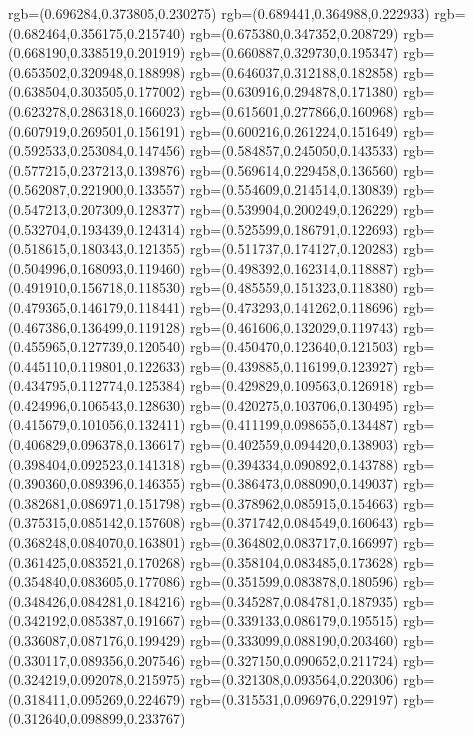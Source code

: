{{{			rgb=(0.696284,0.373805,0.230275)
			rgb=(0.689441,0.364988,0.222933)
			rgb=(0.682464,0.356175,0.215740)
			rgb=(0.675380,0.347352,0.208729)
			rgb=(0.668190,0.338519,0.201919)
			rgb=(0.660887,0.329730,0.195347)
			rgb=(0.653502,0.320948,0.188998)
			rgb=(0.646037,0.312188,0.182858)
			rgb=(0.638504,0.303505,0.177002)
			rgb=(0.630916,0.294878,0.171380)
			rgb=(0.623278,0.286318,0.166023)
			rgb=(0.615601,0.277866,0.160968)
			rgb=(0.607919,0.269501,0.156191)
			rgb=(0.600216,0.261224,0.151649)
			rgb=(0.592533,0.253084,0.147456)
			rgb=(0.584857,0.245050,0.143533)
			rgb=(0.577215,0.237213,0.139876)
			rgb=(0.569614,0.229458,0.136560)
			rgb=(0.562087,0.221900,0.133557)
			rgb=(0.554609,0.214514,0.130839)
			rgb=(0.547213,0.207309,0.128377)
			rgb=(0.539904,0.200249,0.126229)
			rgb=(0.532704,0.193439,0.124314)
			rgb=(0.525599,0.186791,0.122693)
			rgb=(0.518615,0.180343,0.121355)
			rgb=(0.511737,0.174127,0.120283)
			rgb=(0.504996,0.168093,0.119460)
			rgb=(0.498392,0.162314,0.118887)
			rgb=(0.491910,0.156718,0.118530)
			rgb=(0.485559,0.151323,0.118380)
			rgb=(0.479365,0.146179,0.118441)
			rgb=(0.473293,0.141262,0.118696)
			rgb=(0.467386,0.136499,0.119128)
			rgb=(0.461606,0.132029,0.119743)
			rgb=(0.455965,0.127739,0.120540)
			rgb=(0.450470,0.123640,0.121503)
			rgb=(0.445110,0.119801,0.122633)
			rgb=(0.439885,0.116199,0.123927)
			rgb=(0.434795,0.112774,0.125384)
			rgb=(0.429829,0.109563,0.126918)
			rgb=(0.424996,0.106543,0.128630)
			rgb=(0.420275,0.103706,0.130495)
			rgb=(0.415679,0.101056,0.132411)
			rgb=(0.411199,0.098655,0.134487)
			rgb=(0.406829,0.096378,0.136617)
			rgb=(0.402559,0.094420,0.138903)
			rgb=(0.398404,0.092523,0.141318)
			rgb=(0.394334,0.090892,0.143788)
			rgb=(0.390360,0.089396,0.146355)
			rgb=(0.386473,0.088090,0.149037)
			rgb=(0.382681,0.086971,0.151798)
			rgb=(0.378962,0.085915,0.154663)
			rgb=(0.375315,0.085142,0.157608)
			rgb=(0.371742,0.084549,0.160643)
			rgb=(0.368248,0.084070,0.163801)
			rgb=(0.364802,0.083717,0.166997)
			rgb=(0.361425,0.083521,0.170268)
			rgb=(0.358104,0.083485,0.173628)
			rgb=(0.354840,0.083605,0.177086)
			rgb=(0.351599,0.083878,0.180596)
			rgb=(0.348426,0.084281,0.184216)
			rgb=(0.345287,0.084781,0.187935)
			rgb=(0.342192,0.085387,0.191667)
			rgb=(0.339133,0.086179,0.195515)
			rgb=(0.336087,0.087176,0.199429)
			rgb=(0.333099,0.088190,0.203460)
			rgb=(0.330117,0.089356,0.207546)
			rgb=(0.327150,0.090652,0.211724)
			rgb=(0.324219,0.092078,0.215975)
			rgb=(0.321308,0.093564,0.220306)
			rgb=(0.318411,0.095269,0.224679)
			rgb=(0.315531,0.096976,0.229197)
			rgb=(0.312640,0.098899,0.233767)
}}}

